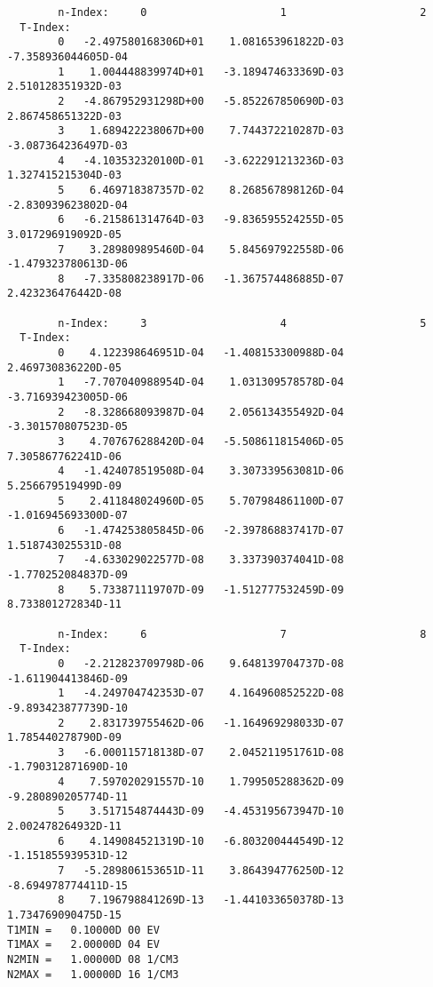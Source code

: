 \documentclass[amsmath,amssymb,a4]{revtex4-2}
\begin{document}
\begin{small}\begin{verbatim}
        n-Index:     0                     1                     2
  T-Index:
        0   -2.497580168306D+01    1.081653961822D-03   -7.358936044605D-04
        1    1.004448839974D+01   -3.189474633369D-03    2.510128351932D-03
        2   -4.867952931298D+00   -5.852267850690D-03    2.867458651322D-03
        3    1.689422238067D+00    7.744372210287D-03   -3.087364236497D-03
        4   -4.103532320100D-01   -3.622291213236D-03    1.327415215304D-03
        5    6.469718387357D-02    8.268567898126D-04   -2.830939623802D-04
        6   -6.215861314764D-03   -9.836595524255D-05    3.017296919092D-05
        7    3.289809895460D-04    5.845697922558D-06   -1.479323780613D-06
        8   -7.335808238917D-06   -1.367574486885D-07    2.423236476442D-08

        n-Index:     3                     4                     5
  T-Index:
        0    4.122398646951D-04   -1.408153300988D-04    2.469730836220D-05
        1   -7.707040988954D-04    1.031309578578D-04   -3.716939423005D-06
        2   -8.328668093987D-04    2.056134355492D-04   -3.301570807523D-05
        3    4.707676288420D-04   -5.508611815406D-05    7.305867762241D-06
        4   -1.424078519508D-04    3.307339563081D-06    5.256679519499D-09
        5    2.411848024960D-05    5.707984861100D-07   -1.016945693300D-07
        6   -1.474253805845D-06   -2.397868837417D-07    1.518743025531D-08
        7   -4.633029022577D-08    3.337390374041D-08   -1.770252084837D-09
        8    5.733871119707D-09   -1.512777532459D-09    8.733801272834D-11

        n-Index:     6                     7                     8
  T-Index:
        0   -2.212823709798D-06    9.648139704737D-08   -1.611904413846D-09
        1   -4.249704742353D-07    4.164960852522D-08   -9.893423877739D-10
        2    2.831739755462D-06   -1.164969298033D-07    1.785440278790D-09
        3   -6.000115718138D-07    2.045211951761D-08   -1.790312871690D-10
        4    7.597020291557D-10    1.799505288362D-09   -9.280890205774D-11
        5    3.517154874443D-09   -4.453195673947D-10    2.002478264932D-11
        6    4.149084521319D-10   -6.803200444549D-12   -1.151855939531D-12
        7   -5.289806153651D-11    3.864394776250D-12   -8.694978774411D-15
        8    7.196798841269D-13   -1.441033650378D-13    1.734769090475D-15
T1MIN =   0.10000D 00 EV
T1MAX =   2.00000D 04 EV
N2MIN =   1.00000D 08 1/CM3
N2MAX =   1.00000D 16 1/CM3
\end{verbatim}\end{small}
\end{document}
